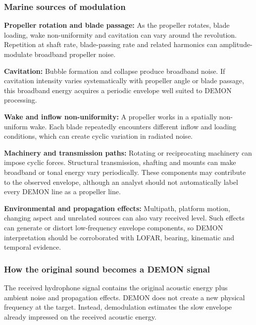 \subsubsection{Marine sources of modulation}

\begin{compactitem}
    \item \textbf{Propeller rotation and blade passage: }As the propeller rotates, blade loading, wake non-uniformity and cavitation can vary around the revolution. Repetition at shaft rate, blade-passing rate and related harmonics can amplitude-modulate broadband propeller noise.
    \item \textbf{Cavitation: }Bubble formation and collapse produce broadband noise. If cavitation intensity varies systematically with propeller angle or blade passage, this broadband energy acquires a periodic envelope well suited to DEMON processing.
    \item \textbf{Wake and inflow non-uniformity: }A propeller works in a spatially non-uniform wake. Each blade repeatedly encounters different inflow and loading conditions, which can create cyclic variation in radiated noise.
    \item \textbf{Machinery and transmission paths: }Rotating or reciprocating machinery can impose cyclic forces. Structural transmission, shafting and mounts can make broadband or tonal energy vary periodically. These components may contribute to the observed envelope, although an analyst should not automatically label every DEMON line as a propeller line.
    \item \textbf{Environmental and propagation effects: }Multipath, platform motion, changing aspect and unrelated sources can also vary received level. Such effects can generate or distort low-frequency envelope components, so DEMON interpretation should be corroborated with LOFAR, bearing, kinematic and temporal evidence.
\end{compactitem}

\subsubsection{How the original sound becomes a DEMON signal}

The received hydrophone signal contains the original acoustic energy plus ambient noise and propagation effects. DEMON does not create a new physical frequency at the target. Instead, demodulation estimates the slow envelope already impressed on the received acoustic energy.

